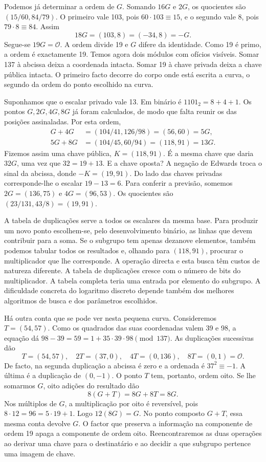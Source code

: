 Podemos já determinar a ordem de \(G\). Somando \(16G\) e \(2G\),
os quocientes são \((15/60,84/79)\). O primeiro vale 103,
pois \(60\cdot103\equiv15\), e o segundo vale 8, pois
\(79\cdot8\equiv84\). Assim
\[
                  18G=(103,8)=(-34,8)=-G .
\]
Segue-se \(19G=\mathcal O\). A ordem divide 19 e \(G\) difere da
identidade. Como 19 é primo, a ordem é exactamente 19. Temos agora
dois módulos com ofícios visíveis. Somar 137 à abcissa deixa a
coordenada intacta. Somar 19 à chave privada deixa a chave pública
intacta. O primeiro facto decorre do corpo onde está escrita a curva,
o segundo da ordem do ponto escolhido na curva.

Suponhamos que o escalar privado vale 13. Em binário é
\(1101_2=8+4+1\). Os pontos \(G,2G,4G,8G\) já foram calculados,
de modo que falta reunir os das posições assinaladas. Por esta ordem,
\[
\begin{aligned}
 G+4G &= (104/41,126/98)=(56,60)=5G,\\
 5G+8G&=(104/45,60/94)=(118,91)=13G .
\end{aligned}
\]
Fizemos assim uma chave pública, \(K=(118,91)\). É a mesma chave
que daria \(32G\), uma vez que \(32=19+13\). E a chave oposta?
A negação de Edwards troca o sinal da abcissa, donde
\(-K=(19,91)\). Do lado das chaves privadas corresponde-lhe o
escalar \(19-13=6\). Para conferir a previsão, somemos
\(2G=(136,75)\) e \(4G=(96,53)\). Os quocientes são
\((23/131,43/8)=(19,91)\).

A tabela de duplicações serve a todos os escalares da mesma base.
Para produzir um novo ponto escolhem-se, pelo desenvolvimento
binário, as linhas que devem contribuir para a soma. Se o subgrupo
tem apenas dezanove elementos, também podemos tabular todos os
resultados e, olhando para \((118,91)\), procurar o multiplicador
que lhe corresponde. A operação directa e esta busca têm custos de
natureza diferente. A tabela de duplicações cresce com o número
de bits do multiplicador. A tabela completa teria uma entrada por
elemento do subgrupo. A dificuldade concreta do logaritmo discreto
depende também dos melhores algoritmos de busca e dos parâmetros
escolhidos.

Há outra conta que se pode ver nesta pequena curva. Consideremos
\(T=(54,57)\). Como os quadrados das suas coordenadas valem 39 e 98,
a equação dá \(98-39=59=1+35\cdot39\cdot98\pmod{137}\).
As duplicações sucessivas dão
\[
 T=(54,57),\quad 2T=(37,0),\quad
 4T=(0,136),\quad 8T=(0,1)=\mathcal O .
\]
De facto, na segunda duplicação a abcissa é zero e a ordenada é
\(37^2\equiv-1\). A última é a duplicação de \((0,-1)\).
O ponto \(T\) tem, portanto, ordem oito. Se lhe somarmos \(G\),
oito adições do resultado dão
\[
                      8(G+T)=8G+8T=8G .
\]
Nos múltiplos de \(G\), a multiplicação por oito é reversível,
pois \(8\cdot12=96=5\cdot19+1\). Logo \(12(8G)=G\).
No ponto composto \(G+T\), essa mesma conta devolve \(G\).
O factor que preserva a informação na componente de ordem 19 apaga
a componente de ordem oito. Reencontraremos as duas operações ao
derivar uma chave para o destinatário e ao decidir a que subgrupo
pertence uma imagem de chave.
